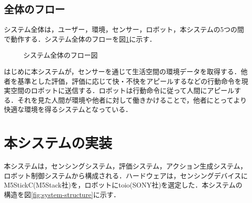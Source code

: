 \documentclass[paper=a4paper,jafontsize=9pt,head_space=15mm,gutter=20mm,
twocolumn,number_of_lines=49, line_length=26zw]{myuarticle}
\begin{document}
\subsection{全体のフロー}
システム全体は，ユーザー，環境，センサー，ロボット，本システムの5つの間で動作する．システム全体のフローを図\ref{fig:system-flow}に示す．

\fboxsep=0pt            %
\fboxrule=1pt            %
\begin{figure}[h]
  \centering
  \caption{システム全体のフロー図}
  \label{fig:system-flow}
\end{figure}

はじめに本システムが，センサーを通じて生活空間の環境データを取得する．他者を基準とした評価，評価に応じて快・不快をアピールするなどの行動命令を現実空間のロボットに送信する．ロボットは行動命令に従って人間にアピールする．それを見た人間が環境や他者に対して働きかけることで，他者にとってより快適な環境を得るシステムとなっている．

\section{本システムの実装}
本システムは，センシングシステム，評価システム，アクション生成システム，ロボット制御システムから構成される．ハードウェアは，センシングデバイスにM5StickC(M5Stack社)を，ロボットにtoio(SONY社)を選定した．本システムの構造を図\ref{fig:system-structure}に示す．
\end{document}
